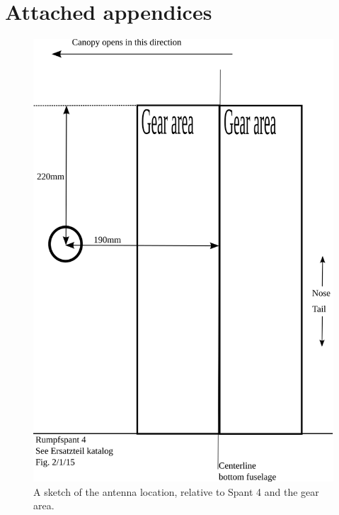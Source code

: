 \documentclass{article}
\begin{document}
\section{Attached appendices}
\listoffigures

\begin{figure}
\includegraphics[width=\textwidth,keepaspectratio]{antenna_location}
\caption{A sketch of the antenna location, relative to Spant 4 and the gear area.}
\label{fig:antenna_location}
\end{figure}
\end{document}
